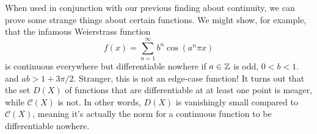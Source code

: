 \documentclass[../m131main.tex]{subfiles}
\begin{document}
When used in conjunction with our previous finding about continuity, we can prove some strange things about certain functions.
We might show, for example, that the infamous Weierstrass function
\[ f(x) = \sum_{n=1}^{\infty} b^n \cos (a^n \pi x) \]
is continuous everywhere but differentiable nowhere if $a \in \mathbb{Z}$ is odd, $0 < b < 1$. and $ab > 1 + 3\pi / 2$.
Stranger, this is not an edge-case function!
It turns out that the set $D(X)$ of functions that are differentiable at at least one point is meager, while $\mathcal{C}(X)$ is not.
In other words, $D(X)$ is vanishingly small compared to $\mathcal{C}(X)$, meaning it's actually the norm for a continuous function to be differentiable nowhere.
\end{document}
